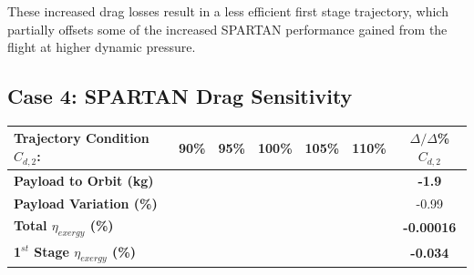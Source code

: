 These increased drag losses result in a less efficient first stage trajectory, which partially offsets some of the increased SPARTAN performance gained from the flight at higher dynamic pressure. 



\subsection{Case 4: SPARTAN Drag Sensitivity}\label{sec:dragvariation}

\begin{table}[ht!]
	\centering
	\begin{tabular}{l c c c c c c} 
		\hline \textbf{Trajectory Condition}   \qquad  $C_{d,2}$: 
		&90\%
		&95\%
		&100\%
		&105\%
		&110\%
		& $\Delta/\Delta$\%$C_{d,2}$
		\\
		\hline \textbf{Payload to Orbit (kg)}
		& \textbf{\PayloadToOrbitCdNinetyNoReturn}
		& \textbf{\PayloadToOrbitCdNinetyFiveNoReturn}
		& \textbf{\PayloadToOrbitCdStandardNoReturn}
		& \textbf{\PayloadToOrbitCdOneHundredFiveNoReturn}
		& \textbf{\PayloadToOrbitCdOneHundredTenNoReturn}
		&\textbf{-1.9}
		\\
		\textbf{Payload Variation (\%)}
		& \PayloadVarCdNinetyNoReturn
		& \PayloadVarCdNinetyFiveNoReturn
		& \PayloadVarCdStandardNoReturn
		& \PayloadVarCdOneHundredFiveNoReturn
		& \PayloadVarCdOneHundredTenNoReturn
		&-0.99
		\\
		\textbf{Total $\eta_{exergy}$ (\%)}
		& \textbf{\totalExergyEffCdNinetyNoReturn}
		& \textbf{\totalExergyEffCdNinetyFiveNoReturn}
		& \textbf{\totalExergyEffCdStandardNoReturn}
		& \textbf{\totalExergyEffCdOneHundredFiveNoReturn}
		& \textbf{\totalExergyEffCdOneHundredTenNoReturn}
		& \textbf{-0.00016}
		\\
		\hline 
		\textbf{1$^{st}$ Stage $\eta_{exergy}$ (\%)}
		& \textbf{\firstExergyEffCdNinetyNoReturn}
		& \textbf{\firstExergyEffCdNinetyFiveNoReturn}
		& \textbf{\firstExergyEffCdStandardNoReturn}
		& \textbf{\firstExergyEffCdOneHundredFiveNoReturn}
		& \textbf{\firstExergyEffCdOneHundredTenNoReturn}
		& \textbf{-0.034}
		\\
	

\end{tabular}
\end{table}
